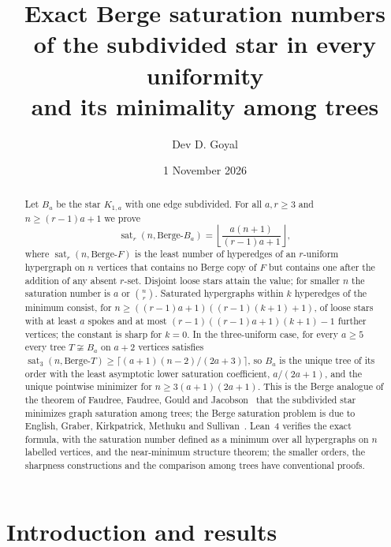 \documentclass[11pt]{article}
\title{\textbf{Exact Berge saturation numbers\\of the subdivided star in every uniformity\\and its minimality among trees}}
\author{Dev D. Goyal}
\date{1 November 2026}
\theoremstyle{definition}
\theoremstyle{remark}
\newcommand{\sat}{\operatorname{sat}}
\newcommand{\BB}{\text{Berge-}B_a}
\begin{document}
\maketitle
\begin{abstract}
Let $B_a$ be the star $K_{1,a}$ with one edge subdivided. For all
$a,r\ge3$ and $n\ge(r-1)a+1$ we prove
\[
\sat_r(n,\BB)=\left\lfloor\frac{a(n+1)}{(r-1)a+1}\right\rfloor ,
\]
where $\sat_r(n,\text{Berge-}F)$ is the least number of hyperedges of an
$r$-uniform hypergraph on $n$ vertices that contains no Berge copy of $F$
but contains one after the addition of any absent $r$-set. Disjoint loose
stars attain the value; for smaller $n$ the saturation number is $a$ or
$\binom nr$. Saturated hypergraphs within $k$ hyperedges of the minimum
consist, for $n\ge((r-1)a+1)((r-1)(k+1)+1)$, of loose stars with at least
$a$ spokes and at most $(r-1)((r-1)a+1)(k+1)-1$ further vertices; the
constant is sharp for $k=0$. In the three-uniform case, for every $a\ge5$
every tree $T\not\cong B_a$ on $a+2$ vertices satisfies
$\sat_3(n,\text{Berge-}T)\ge\lceil(a+1)(n-2)/(2a+3)\rceil$, so $B_a$ is the
unique tree of its order with the least asymptotic lower saturation
coefficient, $a/(2a+1)$, and the unique pointwise minimizer for
$n\ge3(a+1)(2a+1)$. This is the Berge analogue of the theorem of Faudree,
Faudree, Gould and Jacobson~\cite{FFGJ} that the subdivided star minimizes
graph saturation among trees; the Berge saturation problem is due to
English, Graber, Kirkpatrick, Methuku and Sullivan~\cite{EGKMS}. Lean~4
verifies the exact formula, with the
saturation number defined as a minimum over all hypergraphs on $n$ labelled
vertices, and the near-minimum structure theorem; the smaller orders, the
sharpness constructions and the comparison among trees have conventional
proofs.
\end{abstract}

\section{Introduction and results}
\end{document}

